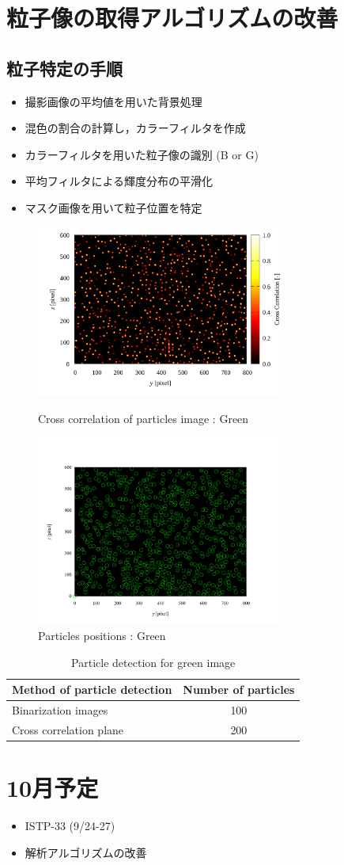 \documentclass[twocolumn,a4j]{jsarticle}
\begin{document}
\section{粒子像の取得アルゴリズムの改善}
\subsection{粒子特定の手順}
\begin{itemize}
	\item 撮影画像の平均値を用いた背景処理
	\item 混色の割合の計算し，カラーフィルタを作成
	\item カラーフィルタを用いた粒子像の識別 (B or G)
	\item 平均フィルタによる輝度分布の平滑化
	\item マスク画像を用いて粒子位置を特定
\end{itemize}

\newpage
\begin{figure}[htbp]
	\includegraphics[keepaspectratio, width=82mm]{../images/cross_crr_particle.png}
	\caption{Cross correlation of particles image : Green}
	\includegraphics[keepaspectratio, width=82mm]{../images/particle_positions_green.png}
	\caption{Particles positions : Green}
\end{figure}

\begin{table}[hbtp]
	\centering
	\caption{Particle detection for green image}
	\begin{tabular}{l c}
		\hline
		Method of particle detection & Number of particles \\ \hline \hline
		Binarization images          & 100                 \\ \hline
		Cross correlation plane      & 200                 \\ \hline
	\end{tabular}
\end{table}

\section{10月予定}
\begin{itemize}
	\item ISTP-33 (9/24-27)
	\item 解析アルゴリズムの改善
\end{itemize}
\end{document}
